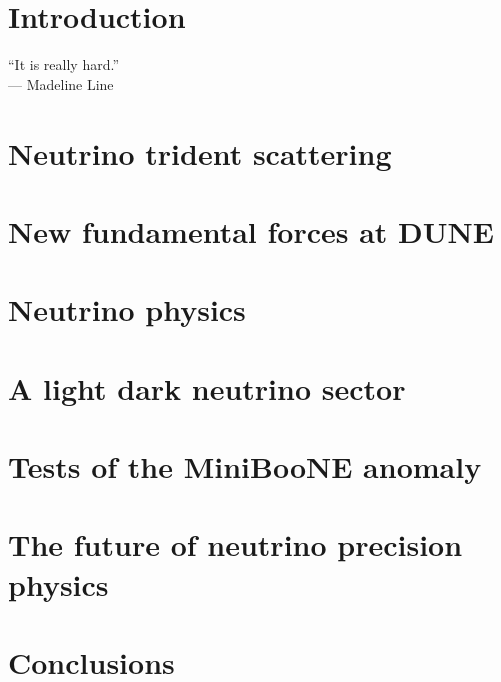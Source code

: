 \documentclass[openany,twoside,frontopenright,chaprunninghead]{ip3thesis}
\begin{document}
\chapter{Introduction}
\begin{flushright}
	``It is really hard.''
	\\--- Madeline Line
\end{flushright}


\chapter{Neutrino trident scattering}


\chapter{New fundamental forces at DUNE}

\chapter{Neutrino physics}


\chapter{A light dark neutrino sector}


\chapter{Tests of the MiniBooNE anomaly}


\chapter{The future of neutrino precision physics}
%

\chapter{Conclusions}

\end{document}
